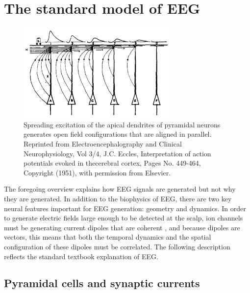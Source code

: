 \section{The standard model of EEG} \label{sec:standard_model}

\begin{figure}
\vspace{-20pt}
\includegraphics[width=80mm]{Figures/chapter1/Eccles_1951.png}
\caption{  Spreading excitation of the apical dendrites of pyramidal neurons generates open field configurations that are aligned in parallel. Reprinted from Electroencephalography and Clinical Neurophysiology, Vol 3/4, J.C. Eccles, Interpretation of action potentials evoked in thecerebral cortex, Pages No. 449-464, Copyright (1951), with permission from Elsevier.
} \label{fig:eccles}
\end{figure}

The foregoing overview explains how EEG signals are generated but not why they are generated. In addition to the biophysics of EEG, there are two key neural features important for EEG generation: geometry and dynamics. In order to generate electric fields large enough to be detected at the scalp, ion channels must be generating current dipoles that are coherent \cite{Buzsaki2012, Nunez2006}, and because dipoles are vectors, this means that both the temporal dynamics and the spatial configuration of these dipoles must be correlated. The following description reflects the standard textbook explanation of EEG.

\subsection{Pyramidal cells and synaptic currents}

